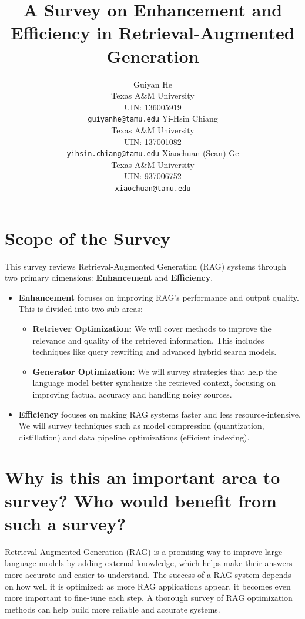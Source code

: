 \documentclass[11pt]{article}
\title{A Survey on Enhancement and Efficiency in Retrieval-Augmented Generation}
\author{
  Guiyan He \\
  Texas A\&M University \\
  UIN: 136005919 \\
  \texttt{guiyanhe@tamu.edu}
  \And
  Yi-Hsin Chiang \\
  Texas A\&M University \\
  UIN: 137001082 \\
  \texttt{yihsin.chiang@tamu.edu}
  \And
  Xiaochuan (Sean) Ge \\
  Texas A\&M University \\
  UIN: 937006752 \\
  \texttt{xiaochuan@tamu.edu}}
\begin{document}
\maketitle

\section{Scope of the Survey}

This survey reviews Retrieval-Augmented Generation (RAG) systems through two primary dimensions: \textbf{Enhancement} and \textbf{Efficiency}.

\begin{itemize}
    \item \textbf{Enhancement} focuses on improving RAG's performance and output quality. This is divided into two sub-areas:
    \begin{itemize}
        \item \textbf{Retriever Optimization:} We will cover methods to improve the relevance and quality of the retrieved information. This includes techniques like query rewriting and advanced hybrid search models.
        \item \textbf{Generator Optimization:} We will survey strategies that help the language model better synthesize the retrieved context, focusing on improving factual accuracy and handling noisy sources.
    \end{itemize}
    
    \item \textbf{Efficiency} focuses on making RAG systems faster and less resource-intensive. We will survey techniques such as model compression (quantization, distillation) and data pipeline optimizations (efficient indexing).
\end{itemize}

\section{Why is this an important area to survey? Who would benefit from such a survey?}
Retrieval-Augmented Generation (RAG) is a promising way to improve large language models by adding external knowledge, which helps make their answers more accurate and easier to understand. The success of a RAG system depends on how well it is optimized; as more RAG applications appear, it becomes even more important to fine-tune each step. A thorough survey of RAG optimization methods can help build more reliable and accurate systems.
\end{document}
